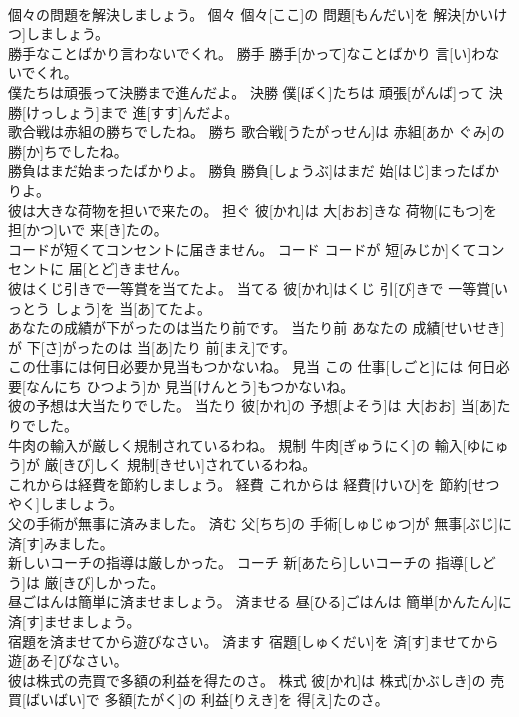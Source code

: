 \documentclass[8pt]{extreport}
\begin{document}
\begin{CJK}{UTF8}{min}
\\	個々の問題を解決しましょう。	個々	個々[ここ]の 問題[もんだい]を 解決[かいけつ]しましょう。	
\\	勝手なことばかり言わないでくれ。	勝手	勝手[かって]なことばかり 言[い]わないでくれ。	
\\	僕たちは頑張って決勝まで進んだよ。	決勝	僕[ぼく]たちは 頑張[がんば]って 決勝[けっしょう]まで 進[すす]んだよ。	
\\	歌合戦は赤組の勝ちでしたね。	勝ち	歌合戦[うたがっせん]は 赤組[あか ぐみ]の 勝[か]ちでしたね。	
\\	勝負はまだ始まったばかりよ。	勝負	勝負[しょうぶ]はまだ 始[はじ]まったばかりよ。	
\\	彼は大きな荷物を担いで来たの。	担ぐ	彼[かれ]は 大[おお]きな 荷物[にもつ]を 担[かつ]いで 来[き]たの。	
\\	コードが短くてコンセントに届きません。	コード	コードが 短[みじか]くてコンセントに 届[とど]きません。	
\\	彼はくじ引きで一等賞を当てたよ。	当てる	彼[かれ]はくじ 引[び]きで 一等賞[いっとう しょう]を 当[あ]てたよ。	
\\	あなたの成績が下がったのは当たり前です。	当たり前	あなたの 成績[せいせき]が 下[さ]がったのは 当[あ]たり 前[まえ]です。	
\\	この仕事には何日必要か見当もつかないね。	見当	この 仕事[しごと]には 何日必要[なんにち ひつよう]か 見当[けんとう]もつかないね。	
\\	彼の予想は大当たりでした。	当たり	彼[かれ]の 予想[よそう]は 大[おお] 当[あ]たりでした。	
\\	牛肉の輸入が厳しく規制されているわね。	規制	牛肉[ぎゅうにく]の 輸入[ゆにゅう]が 厳[きび]しく 規制[きせい]されているわね。	
\\	これからは経費を節約しましょう。	経費	これからは 経費[けいひ]を 節約[せつやく]しましょう。	
\\	父の手術が無事に済みました。	済む	父[ちち]の 手術[しゅじゅつ]が 無事[ぶじ]に 済[す]みました。	
\\	新しいコーチの指導は厳しかった。	コーチ	新[あたら]しいコーチの 指導[しどう]は 厳[きび]しかった。	
\\	昼ごはんは簡単に済ませましょう。	済ませる	昼[ひる]ごはんは 簡単[かんたん]に 済[す]ませましょう。	
\\	宿題を済ませてから遊びなさい。	済ます	宿題[しゅくだい]を 済[す]ませてから 遊[あそ]びなさい。	
\\	彼は株式の売買で多額の利益を得たのさ。	株式	彼[かれ]は 株式[かぶしき]の 売買[ばいばい]で 多額[たがく]の 利益[りえき]を 得[え]たのさ。	

\end{CJK}
\end{document}
